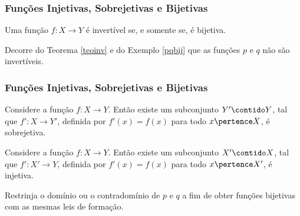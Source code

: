 \begin{frame}
\frametitle{Funções Injetivas, Sobrejetivas e Bijetivas} 

\begin{teorema}\label{teoinv}
Uma função $f: X \to Y$ é invertível se, e somente se, é bijetiva.
\end{teorema}\pause

\begin{exemplo}
Decorre do Teorema \ref{teoinv} e do Exemplo \ref{pqbij} que as
funções $p$ e $q$ não são invertíveis.
\end{exemplo}

\end{frame}






\begin{frame}
\frametitle{Funções Injetivas, Sobrejetivas e Bijetivas} 

\begin{teorema}
	Considere a função $f: X \to Y$. Então existe um subconjunto $Y' \contido Y$, tal que $f' : X \to Y'$, definida por $f'(x) = f(x)$ para todo $x \pertence X$, é sobrejetiva.
	\end{teorema} \pause
	
	\begin{teorema}
		Considere a função $f: X \to Y$. Então existe um subconjunto $X' \contido X$, tal que $f' : X' \to Y$, definida por $f'(x) = f(x)$ para todo $x \pertence X'$, é injetiva.
	\end{teorema} \pause

	\begin{exemplo}
		Restrinja o domínio ou o contradomínio de $p$ e $q$ a fim de obter funções bijetivas com as mesmas leis de formação.
	\end{exemplo}

\end{frame}




